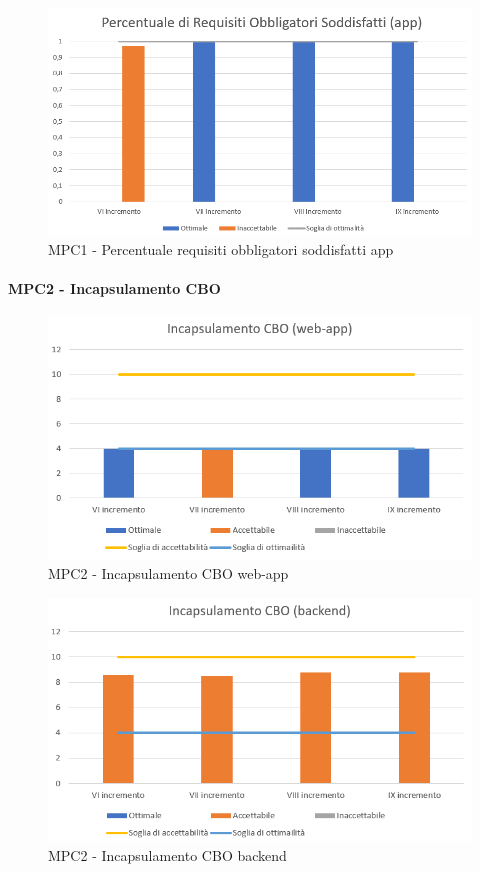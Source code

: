 \begin{figure}[h!]
    \centering
      \includegraphics[scale=0.8]{Immagini/PercReqObbAPPA.PNG}
    \caption{MPC1 - Percentuale requisiti obbligatori soddisfatti app}
  \end{figure}



  \paragraph{MPC2 - Incapsulamento CBO}
  \begin{figure}[h!]
    \centering
      \includegraphics[scale=1]{Immagini/CBO WAA.PNG}
    \caption{MPC2 - Incapsulamento CBO web-app}
  \end{figure}

  \begin{figure}[h!]
    \centering
      \includegraphics[scale=1]{Immagini/CBO BEA.PNG}
    \caption{MPC2 - Incapsulamento CBO backend}
  \end{figure}

